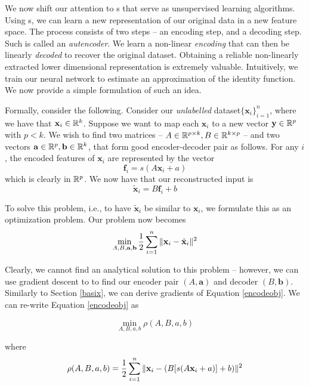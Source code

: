 We now shift our attention to \ann{}s that serve as unsupervised learning algorithms. Using \ann{}s, we can learn a new representation of our original data in a new feature space. The process  consists of two steps -- an encoding step, and a decoding step. Such \ann{} is called an \emph{autencoder}. We learn a non-linear \emph{encoding} that can then be linearly \emph{decoded} to recover the original dataset. Obtaining a reliable non-linearly extracted lower dimensional representation is extremely valuable. Intuitively, we train our neural network to estimate an approximation of the identity function. We now provide a simple formulation of such an idea.

Formally, consider the following. Consider our \emph{unlabelled} dataset$\{\mathbf{x}_i\}_{i=1}^n$, where we have that $\mathbf{x}_i\in\mathbb{R}^k$. Suppose we want to map each $\mathbf{x}_i$ to a new vector $\mathbf{y}\in\mathbb{R}^p$ with $p < k$. We wish to find two matrices -- $A\in\mathbb{R}^{p\times k}, B\in\mathbb{R}^{k\times p}$ -- and two vectors  $\mathbf{a}\in\mathbb{R}^p, \mathbf{b}\in\mathbb{R}^k$, that form good encoder-decoder pair as follows. For any $i$, the encoded features of $\mathbf{x}_i$ are represented by the vector 
\begin{equation}
\mathbf{f}_i = s(A\mathbf{x}_i + a)
\end{equation} 
which is clearly in $\mathbb{R}^p$. We now have that our reconstructed input is 
\begin{equation}
\tilde{\mathbf{x}}_i = B\mathbf{f}_i+b
\end{equation}

To solve this problem, i.e., to have $\tilde{\mathbf{x}}_i$ be similar to $\mathbf{x}_i$, we formulate this as an optimization problem. Our problem now becomes
\begin{equation}
\label{encodeobj}
\min_{A, B, \mathbf{a},\mathbf{b}} \frac{1}{2}\sum_{i = 1}^{n} \Vert \mathbf{x}_i - \tilde{\mathbf{x}}_i \Vert ^ 2
\end{equation}

Clearly, we cannot find an analytical solution to this problem -- however, we can use gradient descent to to find our encoder pair $(A,\mathbf{a})$ and decoder $(B, \mathbf{b})$. Similarly to Section \ref{basix}, we can derive gradients of Equation \eqref{encodeobj}. We can re-write Equation \eqref{encodeobj} as 

\begin{equation}
\min_{A,B,a,b} \rho(A,B,a,b)
\end{equation}

where 
\begin{equation}
\label{eqrho}
\rho(A,B,a,b) = \frac{1}{2}\sum_{i = 1}^{n} \Vert \mathbf{x}_i -  (B [s(A\mathbf{x}_i + a)]+b) \Vert ^ 2
\end{equation}

